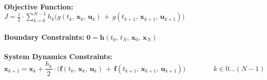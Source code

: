 \textbf{Objective Function: } $\displaystyle
  J = \frac{1}{2} \cdot \sum_{k=0}^{N-1}
  h_k
  \Big( g(t_k,\,  \bm{x}_k,\,  \bm{u}_k)
  \, + \,
  g(t_{k+1},\,  \bm{x}_{k+1},\,  \bm{u}_{k+1}) \Big)
$ \\ \vspace{1em} \\

\textbf{Boundary Constraints: } $\displaystyle
  \bm{0} = \bm{h}(t_0, \, t_N,\, \bm{x}_0, \, \bm{x}_N)
$ \\ \vspace{1em} \\

\textbf{System Dynamics Constraints: } \\
\begin{equation*}
  \bm{x}_{k+1} = \bm{x}_k + \frac{h_k}{2} \cdot
  \Big(
  \bm{f}(t_k,\,  \bm{x}_k,\,  \bm{u}_k)
  \, + \,
  \bm{f}(t_{k+1},\,  \bm{x}_{k+1},\,  \bm{u}_{k+1})
  \Big)
  \quad \quad \quad \quad k \in 0 \dots (N-1)
\end{equation*}


